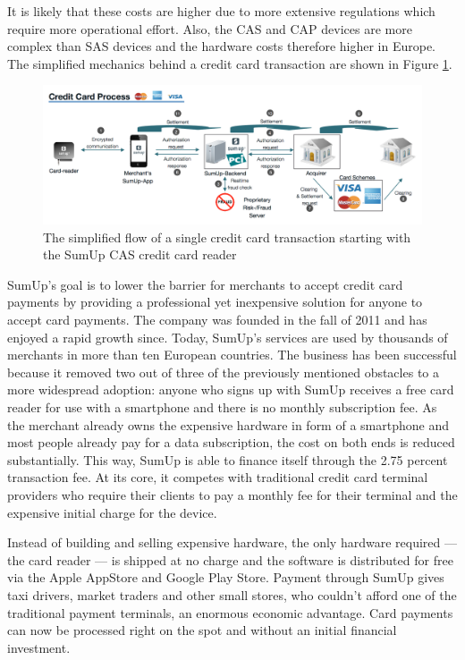 \documentclass[a4paper, oneside]{csthesis}
\begin{document}
It is likely that these costs are higher due to more extensive regulations which require more operational effort. Also, the CAS and CAP devices are more complex than SAS devices and the hardware costs therefore higher in Europe. The simplified mechanics behind a credit card transaction are shown in Figure \ref{fig:credit-card-flow}.

\begin{figure}[tb]
    \begin{center}
        \includegraphics[width=\textwidth]{figures/credit-card-flow.png}
    \end{center}
    \caption{The simplified flow of a single credit card transaction starting with the SumUp CAS credit card reader}
    \label{fig:credit-card-flow}
\end{figure}

SumUp's goal is to lower the barrier for merchants to accept credit card payments by providing a professional yet inexpensive solution for anyone to accept card payments. The company was founded in the fall of 2011 and has enjoyed a rapid growth since.
Today, SumUp's services are used by thousands of merchants in more than ten European countries.
The business has been successful because it removed two out of three of the previously mentioned obstacles to a more widespread adoption: anyone who signs up with SumUp receives a free card reader for use with a smartphone and there is no monthly subscription fee. As the merchant already owns the expensive hardware in form of a smartphone and most people already pay for a data subscription, the cost on both ends is reduced substantially. This way, SumUp is able to finance itself through the 2.75 percent transaction fee. At its core, it competes with traditional credit card terminal providers who require their clients to pay a monthly fee for their terminal and the expensive initial charge for the device.

Instead of building and selling expensive hardware, the only hardware required --- the card reader --- is shipped at no charge and the software is distributed for free via the Apple AppStore and Google Play Store.
Payment through SumUp gives taxi drivers, market traders and other small stores, who couldn't afford one of the traditional payment terminals, an enormous economic advantage. Card payments can now be processed right on the spot and without an initial financial investment.
\end{document}
